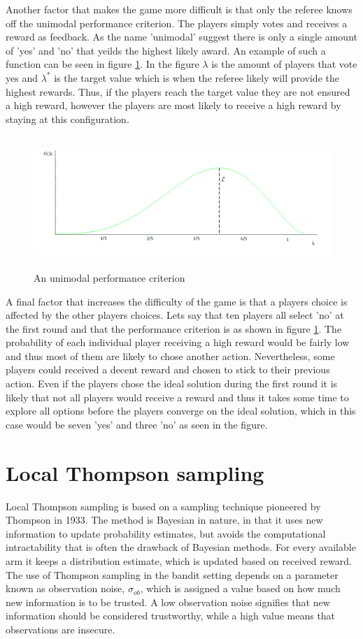 Another factor that makes the game more difficult is that only the referee knows off the unimodal performance criterion.
The players simply votes and receives a reward as feedback. As the name 'unimodal' suggest there is only a single
amount of 'yes' and 'no' that yeilds the highest likely award. An example of such a function can be seen in figure \ref{fig:gfunc}.
In the figure $\lambda$ is the amount of players that vote yes and $\lambda^*$ is the target value which is when the referee
likely will provide the highest rewards. Thus, if the players reach the target value they are not ensured a high reward, however
the players are most likely to receive a high reward by staying at this configuration.
\begin{figure}[h]
\centering
\includegraphics[height=50mm,width=150mm]{images/gfunc}
\caption{An unimodal performance criterion}
\label{fig:gfunc}
\end{figure}
A final factor that increases the difficulty of the game is that a players choice is affected by the other
players choices. Lets say that ten players all select 'no' at the first round and that the performance 
criterion is as shown in figure \ref{fig:gfunc}. The probability of
each individual player receiving a high reward would be fairly low and thus most of them
are likely to chose another action. Nevertheless, some players  could received a decent reward
and chosen to stick to their previous action. Even if the players
chose the ideal solution during the first round it is likely that not all players would
receive a reward and thus it takes some time to explore all options before the players
converge on the ideal solution, which in this case would be seven 'yes' and three 'no' as seen in the figure.

\section{Local Thompson sampling}
Local Thompson sampling \cite{May2011} is based on a sampling technique pioneered by Thompson \cite{Thompson1933} in 1933. 
The method is Bayesian in nature, in that it uses new information to update probability estimates, but avoids the computational intractability that is often the drawback of Bayesian methods.
For every available arm it keeps a distribution estimate, which is 
updated based on received reward. The use of Thompson sampling in the bandit 
setting depends on a parameter known as observation noise, $\sigma_{ob}$, which 
is assigned a value based on how much new information is to be trusted. A low 
observation noise signifies that new information should be considered 
trustworthy, while a high value means that observations are insecure.

